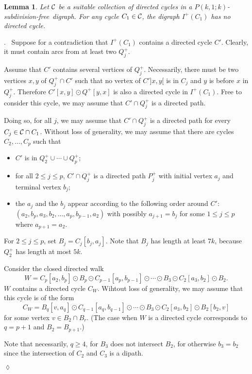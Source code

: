 \documentclass[utf8,11pt]{article}
\theoremstyle{plain}
\newtheorem{lemma}[theorem]{Lemma}
\theoremstyle{definition}
\theoremstyle{remark}
\newenvironment{subproof}{\par\noindent {\it Subproof}.\ }{\hfill$\lozenge$\par\vspace{11pt}}
\newcommand{\free}{subdivision-free}
\begin{document}
\begin{lemma}\label{lem:no-dicycle}
Let ${\cal C}$ be a suitable collection of directed cycles in a $P(k,1;k)$-\free\ digraph. For any cycle $C_1\in {\cal C}$, the digraph
$I^+(C_1)$ has no directed cycle.  
\end{lemma}
\begin{subproof}
Suppose for a contradiction that $I^+(C_1)$  contains a directed cycle $C'$.
Clearly, it must contain arcs from at least two $Q^+_j$.



Assume that $C'$ contains several vertices of $Q^+_j$.
Necessarily, there must be two vertices $x,y$ of $Q^+_j\cap C'$ such that no vertex of $C']x,y[$ is in $C_j$ and  $y$ is before $x$ in $Q^+_j$.
Therefore $C'[x,y]\odot Q^+[y,x]$ is also a directed cycle in $I^+(C_1)$. Free to consider this cycle,
we may assume that $C'\cap Q^+_j$ is a directed path.

Doing so, for all $j$, we may assume that $C'\cap Q^+_j$ is a directed path  for every $C_j\in {\cal C}\cap C_1$.
Without loss of generality, we may assume that there are cycles $C_2, \dots , C_p$ such that
\begin{itemize}
\item $C'$ is in $Q^+_2\cup \cdots  \cup Q^+_p$;
\item for all $2\leq j\leq p$, $C'\cap Q^+_j$ is a directed path $P^+_j$ with initial vertex $a_j$ and terminal vertex $b_j$;
\item the $a_j$ and the $b_j$ appear according to the following order around $C'$: $(a_2, b_p, a_3, b_2, \dots ,   a_p, b_{p-1}, a_2)$ with possibly $a_{j+1}=b_j$ for some $1\leq j \leq p$ where $a_{p+1}=a_2$.
\end{itemize}
For $2\leq j\leq p$, set $B_j=C_j[b_j, a_j]$. Note that $B_j$ has length at least $7k$, because $Q^+_2$ has length at most $5k$.


Consider the closed directed walk $$W=C_p[a_2,b_p]\odot B_p \odot C_{p-1}[a_p, b_{p-1}] \odot  \cdots  \odot  B_3\odot C_2[a_3, b_2]\odot B_2.$$
$W$ contains a directed cycle $C_W$. Wihtout loss of generality, we may assume that this cycle is of the form
$$C_W=B_q[v, a_q] \odot C_{q-1}[a_q, b_{q-1}] \odot  \cdots  \odot  B_3\odot C_2[a_3, b_2]\odot B_2[b_2, v]$$
for some vertex $v\in B_2\cap B_r$. (The case when $W$ is a directed cycle corresponds to $q=p+1$ and $B_2=B_{p+1}$.)

Note that necessarily, $q\geq 4$, for $B_3$ does not intersect $B_2$, for otherwise $b_3=b_2$ since the intersection of $C_2$ and $C_3$ is a dipath.


\end{subproof}
\end{document}
